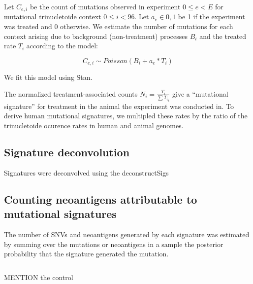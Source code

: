 Let $C_{e,i}$ be the count of mutations observed in experiment $0 \leq e \lt E$ for mutational trinucletoide context $0 \leq i \lt 96$. Let $a_e \in {0,1}$ be 1 if the experiment was treated and 0 otherwise. We estimate the number of mutations for each context arising due to background (non-treatment) processes $B_i$ and the treated rate $T_i$ according to the model:

\[

C_{e,i} \sim \mathit{Poisson}(B_i + a_e * T_i)

\]

We fit this model using Stan\cite{Gelman_2015}.

The normalized treatment-associated counts $N_i = \frac{T_i}{\sum{T_i}_i}$ give a ``mutational signature'' for treatment in the animal the experiment was conducted in. To derive human mutational signatures, we multipled these rates by the ratio of the trinucletoide ocurence rates in human and animal genomes.


\subsection*{Signature deconvolution}
Signatures were deconvolved using the deconstructSigs\cite{Rosenthal_2016}

\subsection*{Counting neoantigens attributable to mutational signatures}
The number of SNVs and neoantigens generated by each signature was estimated by summing over the mutations or neoantigens in a sample the posterior probability that the signature generated the mutation.

\[



\]


MENTION the control



